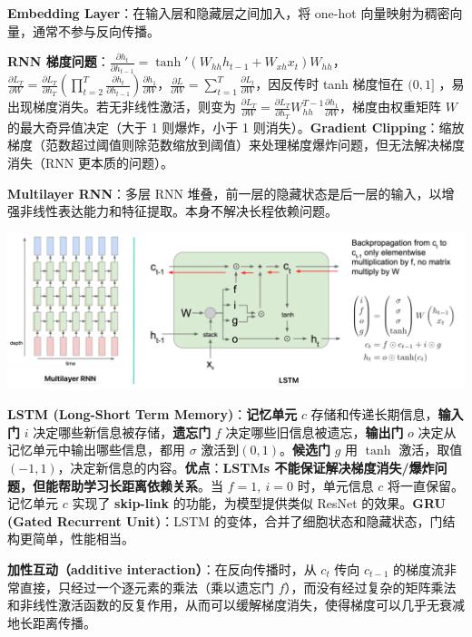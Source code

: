 \documentclass[
  8pt]{extarticle}
\begin{document}
\begin{multicols*}{4}
\textbf{Embedding Layer}：在输入层和隐藏层之间加入，将 one-hot
向量映射为稠密向量，通常不参与反向传播。

\textbf{RNN
梯度问题}：\(\frac{\partial h_t}{\partial h_{t-1}} = \tanh'(W_{hh} h_{t-1} + W_{xh} x_t) W_{hh}\)，\(\frac{\partial L_T}{\partial W} = \frac{\partial L_T}{\partial h_T} \left( \prod_{t=2}^{T} \frac{\partial h_t}{\partial h_{t-1}} \right) \frac{\partial h_1}{\partial W}\)，\(\frac{\partial L}{\partial W} = \sum_{t=1}^{T} \frac{\partial L_t}{\partial W}\)，因反传时
tanh 梯度恒在 \((0, 1]\) ，易出现梯度消失。若无非线性激活，则变为
\(\frac{\partial L_T}{\partial W} = \frac{\partial L_T}{\partial h_T} W_{hh}^{T-1} \frac{\partial h_1}{\partial W}\)，梯度由权重矩阵
\(W\) 的最大奇异值决定（大于 1 则爆炸，小于 1 则消失）。\textbf{Gradient
Clipping}：缩放梯度（范数超过阈值则除范数缩放到阈值）来处理梯度爆炸问题，但无法解决梯度消失（RNN
更本质的问题）。

\textbf{Multilayer RNN}：多层 RNN
堆叠，前一层的隐藏状态是后一层的输入，以增强非线性表达能力和特征提取。本身不解决长程依赖问题。

\includegraphics{./Cheatsheet-01-Sequential-Data.assets/image-20250617214406041.png}

\textbf{LSTM (Long-Short Term Memory)}：\textbf{记忆单元} \(c\)
存储和传递长期信息，\textbf{输入门} \(i\)
决定哪些新信息被存储，\textbf{遗忘门} \(f\)
决定哪些旧信息被遗忘，\textbf{输出门} \(o\)
决定从记忆单元中输出哪些信息，都用 \(\sigma\)
激活到\((0,1)\)。\textbf{候选门} \(g\) 用 \(\tanh\)
激活，取值\((-1,1)\)，决定新信息的内容。\textbf{优点}：\textbf{LSTMs
不能保证解决梯度消失/爆炸问题，但能帮助学习长距离依赖关系}。当
\(f=1,\ i=0\) 时，单元信息 \(c\) 将一直保留。记忆单元 \(c\) 实现了
\textbf{skip-link} 的功能，为模型提供类似 ResNet 的效果。\textbf{GRU
(Gated Recurrent Unit)}：LSTM
的变体，合并了细胞状态和隐藏状态，门结构更简单，性能相当。

\textbf{加性互动（additive interaction）}：在反向传播时，从 \(c_t\) 传向
\(c_{t-1}\) 的梯度流非常直接，只经过一个逐元素的乘法（乘以遗忘门
\(f\)），而没有经过复杂的矩阵乘法和非线性激活函数的反复作用，从而可以缓解梯度消失，使得梯度可以几乎无衰减地长距离传播。


\end{multicols*}
\end{document}
